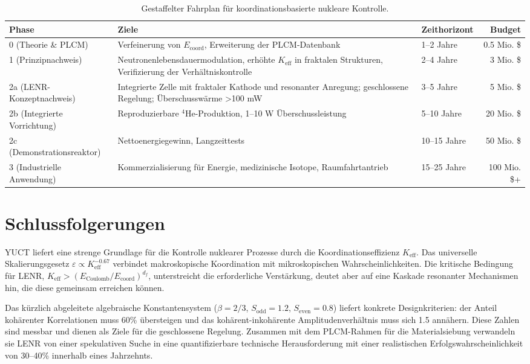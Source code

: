 \documentclass[12pt]{article}
\theoremstyle{remark}
\newcommand{\Keff}{K_{\mathrm{eff}}}
\newcommand{\df}{d_{\!f}}
\newcommand{\Sodd}{S_{\mathrm{odd}}}
\newcommand{\Seven}{S_{\mathrm{even}}}
\begin{document}
	\begin{table}[htbp]
		\centering
		\caption{Gestaffelter Fahrplan für koordinationsbasierte nukleare Kontrolle.}
		\label{tab:roadmap}
		\small
		\begin{tabular}{l p{5cm} l r}
			\toprule
			\textbf{Phase} & \textbf{Ziele} & \textbf{Zeithorizont} & \textbf{Budget} \\
			\midrule
			0 (Theorie \& PLCM) & Verfeinerung von \(E_{\mathrm{coord}}\), Erweiterung der PLCM-Datenbank & 1–2 Jahre & 0.5 Mio. \$ \\
			1 (Prinzipnachweis) & Neutronenlebensdauermodulation, erhöhte \(\Keff\) in fraktalen Strukturen, Verifizierung der Verhältniskontrolle & 2–4 Jahre & 3 Mio. \$ \\
			2a (LENR-Konzeptnachweis) & Integrierte Zelle mit fraktaler Kathode und resonanter Anregung; geschlossene Regelung; Überschusswärme >100 mW & 3–5 Jahre & 5 Mio. \$ \\
			2b (Integrierte Vorrichtung) & Reproduzierbare \(^4\)He-Produktion, 1–10 W Überschussleistung & 5–10 Jahre & 20 Mio. \$ \\
			2c (Demonstrationsreaktor) & Nettoenergiegewinn, Langzeittests & 10–15 Jahre & 50 Mio. \$ \\
			3 (Industrielle Anwendung) & Kommerzialisierung für Energie, medizinische Isotope, Raumfahrtantrieb & 15–25 Jahre & 100 Mio. \$+ \\
			\bottomrule
		\end{tabular}
	\end{table}
	
	\section{Schlussfolgerungen}
	\label{sec:conclusion}
	
	YUCT liefert eine strenge Grundlage für die Kontrolle nuklearer Prozesse durch die Koordinationseffizienz \(\Keff\). Das universelle Skalierungsgesetz \(\varepsilon \propto \Keff^{-0.67}\) verbindet makroskopische Koordination mit mikroskopischen Wahrscheinlichkeiten. Die kritische Bedingung für LENR, \(\Keff > (E_{\text{Coulomb}}/E_{\mathrm{coord}})^{\df}\), unterstreicht die erforderliche Verstärkung, deutet aber auf eine Kaskade resonanter Mechanismen hin, die diese gemeinsam erreichen können.
	
	Das kürzlich abgeleitete algebraische Konstantensystem (\(\beta=2/3\), \(\Sodd=1.2\), \(\Seven=0.8\)) liefert konkrete Designkriterien: der Anteil kohärenter Korrelationen muss 60\% übersteigen und das kohärent-inkohärente Amplitudenverhältnis muss sich 1.5 annähern. Diese Zahlen sind messbar und dienen als Ziele für die geschlossene Regelung. Zusammen mit dem PLCM-Rahmen für die Materialsiebung verwandeln sie LENR von einer spekulativen Suche in eine quantifizierbare technische Herausforderung mit einer realistischen Erfolgswahrscheinlichkeit von 30–40\% innerhalb eines Jahrzehnts.
	
\end{document}
